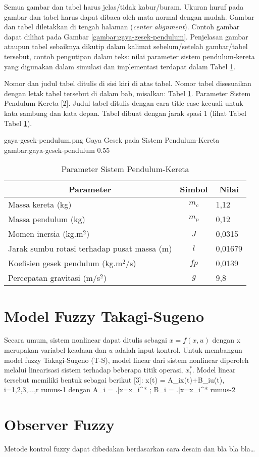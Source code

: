 Semua gambar dan tabel harus jelas/tidak kabur/buram. Ukuran huruf pada gambar dan tabel harus dapat dibaca oleh mata normal dengan mudah. Gambar dan tabel diletakkan di tengah halaman (\emph{center alignment}). Contoh gambar dapat dilihat pada Gambar \ref{gambar:gaya-gesek-pendulum}. Penjelasan gambar ataupun tabel sebaiknya dikutip dalam kalimat sebelum/setelah gambar/tabel tersebut, contoh pengutipan dalam teks: nilai parameter sistem pendulum-kereta yang digunakan dalam simulasi dan implementasi terdapat dalam Tabel \ref{tabel:pendulum}.

Nomor dan judul tabel ditulis di sisi kiri di atas tabel. Nomor tabel disesuaikan dengan letak tabel tersebut di dalam bab, misalkan: Tabel \ref{tabel:pendulum}. Parameter Sistem Pendulum-Kereta [2]. Judul tabel ditulis dengan cara title case kecuali untuk kata sambung dan kata depan. Tabel dibuat dengan jarak spasi 1 (lihat  Tabel Tabel \ref{tabel:pendulum}).

\gambar
    {gaya-gesek-pendulum.png}
    {Gaya Gesek pada Sistem Pendulum-Kereta}
    {gambar:gaya-gesek-pendulum}
    {0.55}
   
\begin{table}[H]
    \caption{Parameter Sistem Pendulum-Kereta}
    \centering
    \begin{tabular}{ lcl } 
        \toprule
        \multicolumn{1}{c}{\textbf{Parameter}} & \multicolumn{1}{c}{\textbf{Simbol}} & \multicolumn{1}{c}{\textbf{Nilai}} \\
        \midrule
        Massa kereta (kg) & $m_c$ & 1,12 \\
        Massa pendulum (kg) & $m_p$ & 0,12 \\
        Momen inersia (kg.m$^2$) & $J$ & 0,0315 \\
        Jarak sumbu rotasi terhadap pusat massa (m) & $l$ & 0,01679 \\
        Koefisien gesek pendulum (kg.m$^2$/s) & $fp$ & 0,0139 \\
        Percepatan gravitasi (m/s$^2$) & $g$ & 9,8 \\
        \bottomrule
    \end{tabular}
    \label{tabel:pendulum}
\end{table}

\section{Model Fuzzy Takagi-Sugeno}

Secara umum, sistem nonlinear dapat ditulis sebagai $x = f(x,u)$  dengan x merupakan variabel keadaan dan $u$ adalah input kontrol. Untuk membangun model fuzzy Takagi-Sugeno (T-S), model linear dari sistem nonlinear diperoleh melalui linearisasi sistem terhadap beberapa titik operasi, $x_i^*$. Model linear tersebut memiliki bentuk sebagai berikut [3]:
\rumus
    {x(t) = A_ix(t)+B_iu(t), i=1,2,3,...,r}
    {rumus-1}
\noindent dengan
\rumus
    {A_i = \left.\right|x=x_i^* ; B_i = \left.\right|x=x_i^*}
    {rumus-2}

\section{Observer Fuzzy}

Metode kontrol fuzzy dapat dibedakan berdasarkan cara desain dan bla bla bla…